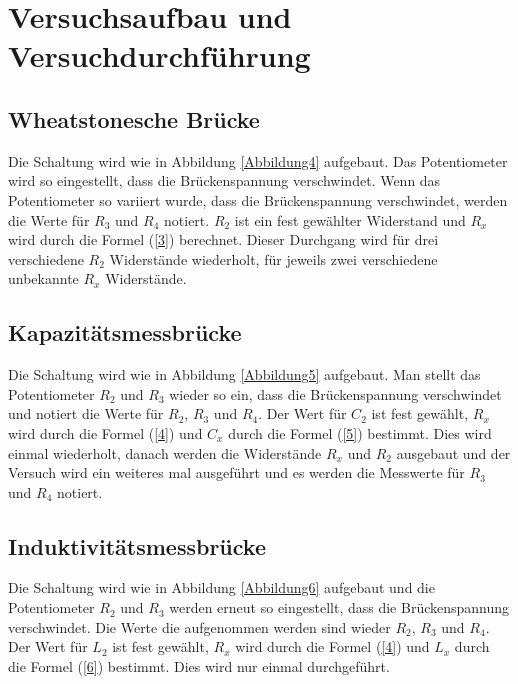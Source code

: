 \section{Versuchsaufbau und Versuchdurchführung}

\subsection{Wheatstonesche Brücke}

\begin{flushleft}
    Die Schaltung wird wie in Abbildung \ref{Abbildung4} aufgebaut.
    Das Potentiometer wird so eingestellt, dass die Brückenspannung verschwindet.
    Wenn das Potentiometer so variiert wurde, dass die Brückenspannung verschwindet, werden die Werte für $R_{3}$ und $R_{4}$ notiert.
    $ R_{2} $ ist ein fest gewählter Widerstand und $R_{x}$ wird durch die Formel (\ref{3}) berechnet.
    Dieser Durchgang wird für drei verschiedene $ R_{2} $ Widerstände wiederholt, für jeweils zwei verschiedene unbekannte $R_{x}$ Widerstände.
\end{flushleft}

\subsection{Kapazitätsmessbrücke}

\begin{flushleft}
    Die Schaltung wird wie in Abbildung \ref{Abbildung5} aufgebaut.
    Man stellt das Potentiometer $R_{2}$ und $R_{3}$ wieder so ein, dass die Brückenspannung verschwindet und notiert die Werte für $R_{2}$, $R_{3}$ und $R_{4}$.
    Der Wert für $C_{2}$ ist fest gewählt, $R_{x}$ wird durch die Formel (\ref{4}) und $C_{x}$ durch die Formel (\ref{5}) bestimmt.
    Dies wird einmal wiederholt, danach werden die Widerstände $R_{x}$ und $R_{2}$ ausgebaut und der Versuch wird ein weiteres mal ausgeführt und es werden die Messwerte für $R_{3}$ und $R_{4}$ notiert.
\end{flushleft}

\subsection{Induktivitätsmessbrücke}

\begin{flushleft}
    Die Schaltung wird wie in Abbildung \ref{Abbildung6} aufgebaut und die Potentiometer $R_{2}$ und $ R_{3} $ werden erneut so eingestellt, dass die Brückenspannung verschwindet.
    Die Werte die aufgenommen werden sind wieder $R_{2}$, $R_{3}$ und $R_{4}$.
    Der Wert für $L_{2}$ ist fest gewählt, $R_{x}$ wird durch die Formel (\ref{4}) und $L_{x}$ durch die Formel (\ref{6}) bestimmt.
    Dies wird nur einmal durchgeführt.
\end{flushleft}


